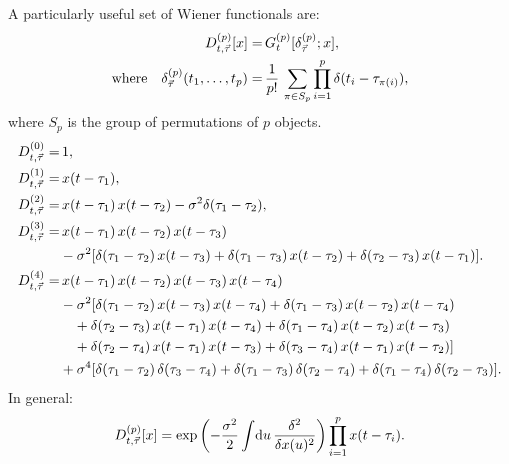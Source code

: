 \documentclass[12pt]{article}
\theoremstyle{slplain}
\theoremstyle{sldefinition}
\theoremstyle{remark}
\begin{document}
A particularly useful set of Wiener functionals are:
%
\begin{equation}\label{eq:wienerdelta}
  \begin{aligned}
    D^{(p)}_{t,\vec{\tau}}[x] =& \, G^{(p)}_t[\delta^{(p)}_{\vec{\tau}};x], \\ \text{where}\quad
    \delta^{(p)}_{\vec{\tau}}(t_1,\ldots,t_p) =& \, \frac{1}{p!}\,\sum_{\pi\in S_p} \prod_{i=1}^p \delta(t_i-\tau_{\pi(i)}),
  \end{aligned}
\end{equation}
%
where $S_p$ is the group of permutations of $p$ objects. 
\eg
%
\begin{equation}\label{eq:wienerdeltaex}
  \begin{aligned}
    D^{(0)}_{t,\vec{\tau}} =&\, 1, \\
    D^{(1)}_{t,\vec{\tau}} =&\, x(t-\tau_1), \\
    D^{(2)}_{t,\vec{\tau}} =&\, x(t-\tau_1)\,x(t-\tau_2) - \sigma^2\delta(\tau_1-\tau_2), \\
    D^{(3)}_{t,\vec{\tau}} =&\, x(t-\tau_1)\,x(t-\tau_2)\,x(t-\tau_3) \\& - \sigma^2 [\delta(\tau_1-\tau_2)\,x(t-\tau_3) + \delta(\tau_1-\tau_3)\,x(t-\tau_2) + \delta(\tau_2-\tau_3)\,x(t-\tau_1) ]. \\
    D^{(4)}_{t,\vec{\tau}} =&\, x(t-\tau_1)\,x(t-\tau_2)\,x(t-\tau_3)\,x(t-\tau_4) \\& - \sigma^2 [\delta(\tau_1-\tau_2)\,x(t-\tau_3)\,x(t-\tau_4) + \delta(\tau_1-\tau_3)\,x(t-\tau_2)\,x(t-\tau_4) \\&\quad + \delta(\tau_2-\tau_3)\,x(t-\tau_1)\,x(t-\tau_4) + \delta(\tau_1-\tau_4)\,x(t-\tau_2)\,x(t-\tau_3) \\&\quad + \delta(\tau_2-\tau_4)\,x(t-\tau_1)\,x(t-\tau_3) +     \delta(\tau_3-\tau_4)\,x(t-\tau_1)\,x(t-\tau_2) ] \\& + \sigma^4 [ \delta(\tau_1-\tau_2)\,\delta(\tau_3-\tau_4) + \delta(\tau_1-\tau_3)\,\delta(\tau_2-\tau_4) + \delta(\tau_1-\tau_4)\,\delta(\tau_2-\tau_3) ].
  \end{aligned}
\end{equation}
%
In general:
%
\begin{equation}\label{eq:wienerdeltagen}
  D^{(p)}_{t,\vec{\tau}}[x] = \exp\left ( -\frac{\sigma^2}{2}\int\!\mathrm{d} u\,\frac{\delta ^2}{\delta x(u)^2} \right ) \prod_{i=1}^p x(t-\tau_i).
\end{equation}
%
\end{document}
